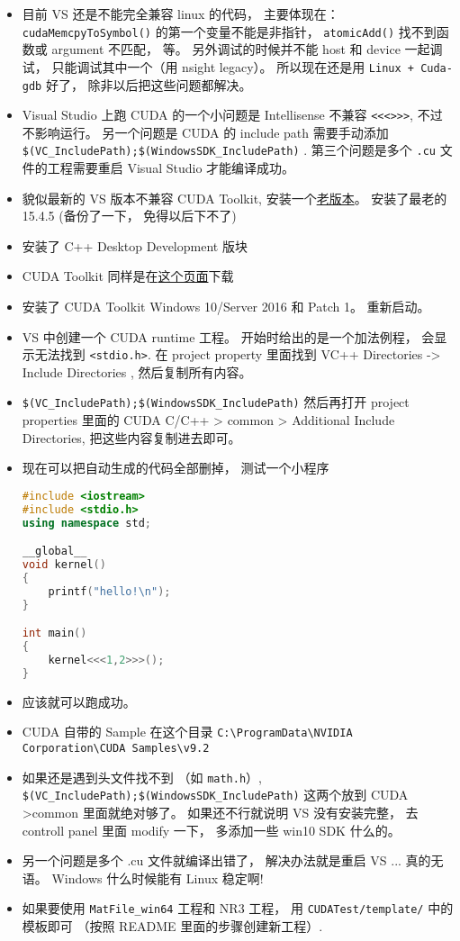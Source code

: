 

\begin{itemize}
\item 目前 VS 还是不能完全兼容 linux 的代码， 主要体现在： \verb|cudaMemcpyToSymbol()| 的第一个变量不能是非指针， \verb`atomicAdd()` 找不到函数或 argument 不匹配， 等。 另外调试的时候并不能 host 和 device 一起调试， 只能调试其中一个（用 nsight legacy）。 所以现在还是用 \verb|Linux + Cuda-gdb| 好了， 除非以后把这些问题都解决。
\item Visual Studio 上跑 CUDA 的一个小问题是 Intellisense 不兼容 \verb`<<<>>>`, 不过不影响运行。 另一个问题是 CUDA 的 include path 需要手动添加 \verb`$(VC_IncludePath);$(WindowsSDK_IncludePath)` . 第三个问题是多个 \verb`.cu` 文件的工程需要重启 Visual Studio 才能编译成功。
\item 貌似最新的 VS 版本不兼容 CUDA Toolkit, 安装一个\href{https://docs.microsoft.com/en-us/visualstudio/productinfo/installing-an-earlier-release-of-vs2017}{老版本}。 安装了最老的 15.4.5 (备份了一下， 免得以后下不了)
\item 安装了 C++ Desktop Development 版块
\item CUDA Toolkit 同样是在\href{https://developer.nvidia.com/cuda-downloads}{这个页面}下载
\item 安装了 CUDA Toolkit Windows 10/Server 2016 和 Patch 1。 重新启动。
\item VS 中创建一个 CUDA runtime 工程。 开始时给出的是一个加法例程， 会显示无法找到 \verb`<stdio.h>`. 在 project property 里面找到 VC++ Directories -> Include Directories , 然后复制所有内容。
\item \verb|$(VC_IncludePath);$(WindowsSDK_IncludePath)| 然后再打开 project properties 里面的 CUDA C/C++ >  common > Additional Include Directories, 把这些内容复制进去即可。
\item 现在可以把自动生成的代码全部删掉， 测试一个小程序
\begin{lstlisting}[language=cpp]
#include <iostream>
#include <stdio.h>
using namespace std;

__global__
void kernel()
{
	printf("hello!\n");
}

int main()
{
	kernel<<<1,2>>>();
}
\end{lstlisting}
\item 应该就可以跑成功。
\item CUDA 自带的 Sample 在这个目录 \verb|C:\ProgramData\NVIDIA Corporation\CUDA Samples\v9.2|
\item 如果还是遇到头文件找不到 （如 \verb`math.h`）, \verb`$(VC_IncludePath);$(WindowsSDK_IncludePath)` 这两个放到 CUDA >common 里面就绝对够了。 如果还不行就说明 VS 没有安装完整， 去 controll panel 里面 modify 一下， 多添加一些 win10 SDK 什么的。
\item 另一个问题是多个 .cu 文件就编译出错了， 解决办法就是重启 VS ... 真的无语。 Windows 什么时候能有 Linux 稳定啊!
\item 如果要使用 \verb|MatFile_win64| 工程和 NR3 工程， 用 \verb|CUDATest/template/| 中的模板即可 （按照 README 里面的步骤创建新工程）.
\end{itemize}
